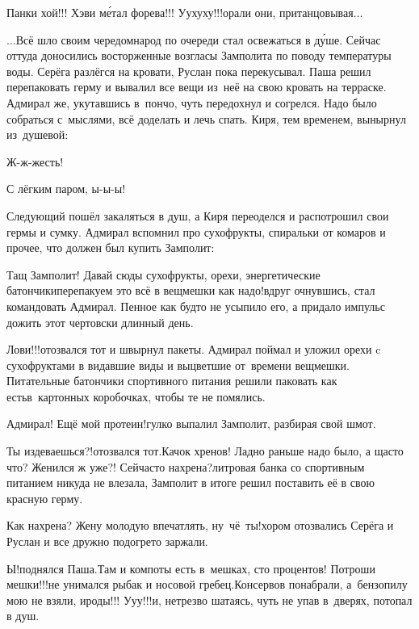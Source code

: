 \vspace{0.2cm}
\diagdash Панки хой!!! Хэви м\'{е}тал форева!!! У\sdash у\sdash х\sdash у\sdash х\sdash у!!!\mdash орали они, пританцовывая$\ldots$

\vspace{0.5cm}
$\ldots$Всё шло своим чередом\mdash народ по очереди стал освежаться в д\'{у}ше. Сейчас оттуда доносились восторженные возгласы Замполита по поводу температуры воды. Серёга разлёгся на кровати, Руслан пока перекусывал. Паша решил перепаковать герму и вывалил все вещи из~неё на свою кровать на терраске. Адмирал же, укутавшись в~пончо, чуть передохнул и согрелся. Надо было собраться с~мыслями, всё доделать и лечь спать. Киря, тем временем, вынырнул из~душевой:

\diagdash Ж-ж-жесть! 

\diagdash С лёгким паром, ы-ы-ы!

Следующий пошёл закаляться в душ, а Киря переоделся и распотрошил свои гермы и сумку. Адмирал вспомнил про сухофрукты, спиральки от комаров и прочее, что должен был купить Замполит:

\diagdash Тащ Замполит! Давай сюды сухофрукты, орехи, энергетические батончики\mdash перепакуем это всё в вещмешки как надо!\mdash вдруг очнувшись, стал командовать Адмирал. Пенное как будто не усыпило его, а придало импульс дожить этот чертовски длинный день. 

\diagdash Лови!!!\mdash отозвался тот и швырнул пакеты. Адмирал поймал и уложил орехи c сухофруктами в видавшие виды и выцветшие от~времени вещмешки. Питательные батончики спортивного питания решили паковать как есть\mdash в~картонных коробочках, чтобы те не помялись.

\diagdash Адмирал! Ещё мой протеин!\mdash гулко выпалил Замполит, разбирая свой шмот.

\diagdash Ты издеваешься?!\mdash отозвался тот.\mdash Качок хренов! Ладно раньше надо было, а щас\sdash то что? Женился ж уже?! Сейчас\sdash то нахрена?\sdash литровая банка со спортивным питанием никуда не влезала, Замполит в итоге решил поставить её в свою красную герму.

\diagdash Как нахрена? Жену молодую впечатлять, ну~чё~ты!\mdash хором отозвались Серёга и Руслан и все дружно подогрето заржали.

\diagdash Ы!\mdash поднялся Паша.\mdash Там и компоты есть в~мешках, сто процентов! Потроши мешки!!!\mdash не унимался рыбак и носовой гребец.\mdash Консервов понабрали, а~бензопилу мою не взяли, ироды!!! У\sdash у\sdash у!!!\mdash и, нетрезво шатаясь, чуть не упав в~дверях, потопал в душ.

